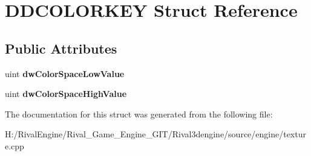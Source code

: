 \hypertarget{struct_d_d_c_o_l_o_r_k_e_y}{}\section{D\+D\+C\+O\+L\+O\+R\+K\+EY Struct Reference}
\label{struct_d_d_c_o_l_o_r_k_e_y}
\subsection*{Public Attributes}
\begin{DoxyCompactItemize}
\item 
\mbox{\label{struct_d_d_c_o_l_o_r_k_e_y_ab66923eb20f38588a6214cf562f3de9d}} 
uint {\bfseries dw\+Color\+Space\+Low\+Value}
\item 
\mbox{\label{struct_d_d_c_o_l_o_r_k_e_y_a19b1ff4a4d102b661372afbad864bb2a}} 
uint {\bfseries dw\+Color\+Space\+High\+Value}
\end{DoxyCompactItemize}


The documentation for this struct was generated from the following file\+:\begin{DoxyCompactItemize}
\item 
H\+:/\+Rival\+Engine/\+Rival\+\_\+\+Game\+\_\+\+Engine\+\_\+\+G\+I\+T/\+Rival3dengine/source/engine/texture.\+cpp\end{DoxyCompactItemize}
